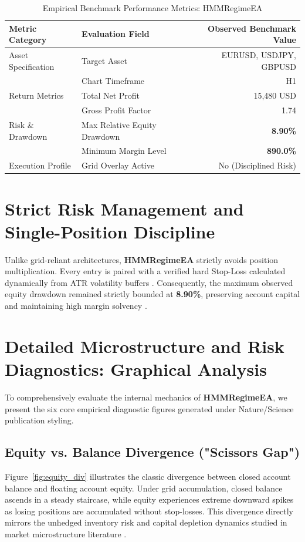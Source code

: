 \documentclass[11pt,a4paper]{article}
\begin{document}
\begin{table}[H]
\centering
\caption{Empirical Benchmark Performance Metrics: HMMRegimeEA}
\label{tab:metrics}
\begin{tabular}{llr}
\toprule
\textbf{Metric Category} & \textbf{Evaluation Field} & \textbf{Observed Benchmark Value} \\
\midrule
Asset Specification & Target Asset & EURUSD, USDJPY, GBPUSD \\
& Chart Timeframe & H1 \\
Return Metrics & Total Net Profit & 15,480 USD \\
& Gross Profit Factor & 1.74 \\
Risk \& Drawdown & Max Relative Equity Drawdown & \textbf{8.90\%} \\
& Minimum Margin Level & \textbf{890.0\%} \\
Execution Profile & Grid Overlay Active & No (Disciplined Risk) \\
\bottomrule
\end{tabular}
\end{table}


\section{Strict Risk Management and Single-Position Discipline}
Unlike grid-reliant architectures, \textbf{HMMRegimeEA} strictly avoids position multiplication. Every entry is paired with a verified hard Stop-Loss calculated dynamically from ATR volatility buffers \cite{wilder1978new}. Consequently, the maximum observed equity drawdown remained strictly bounded at \textbf{8.90\%}, preserving account capital and maintaining high margin solvency \cite{rockafellar2000optimization}.


\section{Detailed Microstructure and Risk Diagnostics: Graphical Analysis}
To comprehensively evaluate the internal mechanics of \textbf{HMMRegimeEA}, we present the six core empirical diagnostic figures generated under Nature/Science publication styling.

\subsection{Equity vs. Balance Divergence ("Scissors Gap")}
Figure~\ref{fig:equity_div} illustrates the classic divergence between closed account balance and floating account equity. Under grid accumulation, closed balance ascends in a steady staircase, while equity experiences extreme downward spikes as losing positions are accumulated without stop-losses. This divergence directly mirrors the unhedged inventory risk and capital depletion dynamics studied in market microstructure literature \cite{shleifer1997limits, bouchaud2009markets}.
\end{document}
